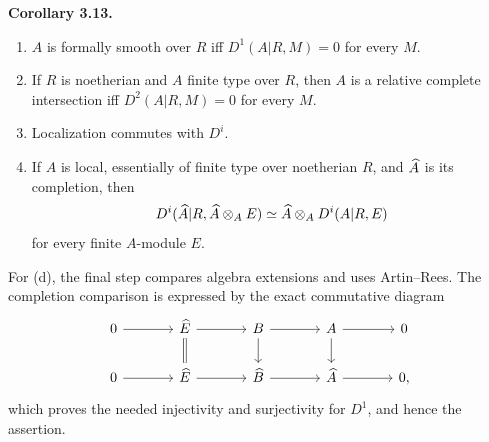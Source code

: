 \documentclass[11pt]{article}
\begin{document}
\textbf{Corollary 3.13.}
\begin{enumerate}[label=\textup{(\alph*)}]
\item \(A\) is formally smooth over \(R\) iff \(D^1(A|R,M)=0\) for every \(M\).
\item If \(R\) is noetherian and \(A\) finite type over \(R\), then \(A\) is a relative complete intersection iff \(D^2(A|R,M)=0\) for every \(M\).
\item Localization commutes with \(D^i\).
\item If \(A\) is local, essentially of finite type over noetherian \(R\), and \(\widehat A\) is its completion, then
\[
D^i(\widehat A|R,\widehat A\otimes_AE)\simeq \widehat A\otimes_AD^i(A|R,E)
\]
for every finite \(A\)-module \(E\).
\end{enumerate}
For (d), the final step compares algebra extensions and uses Artin--Rees.  The completion comparison is expressed by the exact commutative diagram
\[
\begin{tikzcd}[column sep=large]
0\arrow[r]&\Ehat\arrow[r]\arrow[d,equal]&B\arrow[r]\arrow[d]&A\arrow[r]\arrow[d]&0\\
0\arrow[r]&\Ehat\arrow[r]&\Bhat\arrow[r]&\Ahat\arrow[r]&0,
\end{tikzcd}
\]
which proves the needed injectivity and surjectivity for \(D^1\), and hence the assertion.
\end{document}
